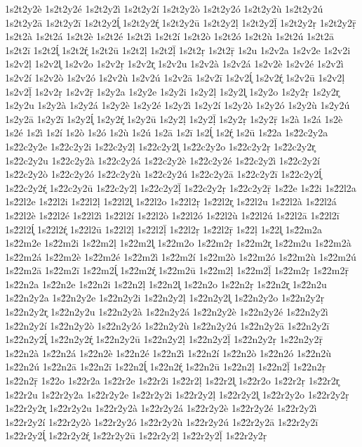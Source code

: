 {1s2t2y2è
1s2t2y2é
1s2t2y2ì
1s2t2y2í
1s2t2y2ò
1s2t2y2ó
1s2t2y2ù
1s2t2y2ú
1s2t2y2ā
1s2t2y2ī
1s2t2y2ĺ̥
1s2t2y2ŕ̥
1s2t2y2ū
1s2t2y2ḷ
1s2t2y2ḹ
1s2t2y2ṛ
1s2t2y2ṝ
1s2t2à
1s2t2á
1s2t2è
1s2t2é
1s2t2ì
1s2t2í
1s2t2ò
1s2t2ó
1s2t2ù
1s2t2ú
1s2t2ā
1s2t2ī
1s2t2ĺ̥
1s2t2ŕ̥
1s2t2ū
1s2t2ḷ
1s2t2ḹ
1s2t2ṛ
1s2t2ṝ
1s2u
1s2v2a
1s2v2e
1s2v2i
1s2v2ḷ
1s2v2l̥
1s2v2o
1s2v2ṛ
1s2v2r̥
1s2v2u
1s2v2à
1s2v2á
1s2v2è
1s2v2é
1s2v2ì
1s2v2í
1s2v2ò
1s2v2ó
1s2v2ù
1s2v2ú
1s2v2ā
1s2v2ī
1s2v2ĺ̥
1s2v2ŕ̥
1s2v2ū
1s2v2ḷ
1s2v2ḹ
1s2v2ṛ
1s2v2ṝ
1s2y2a
1s2y2e
1s2y2i
1s2y2ḷ
1s2y2l̥
1s2y2o
1s2y2ṛ
1s2y2r̥
1s2y2u
1s2y2à
1s2y2á
1s2y2è
1s2y2é
1s2y2ì
1s2y2í
1s2y2ò
1s2y2ó
1s2y2ù
1s2y2ú
1s2y2ā
1s2y2ī
1s2y2ĺ̥
1s2y2ŕ̥
1s2y2ū
1s2y2ḷ
1s2y2ḹ
1s2y2ṛ
1s2y2ṝ
1s2à
1s2á
1s2è
1s2é
1s2ì
1s2í
1s2ò
1s2ó
1s2ù
1s2ú
1s2ā
1s2ī
1s2ĺ̥
1s2ŕ̥
1s2ū
1s2́2a
1s2́2c2y2a
1s2́2c2y2e
1s2́2c2y2i
1s2́2c2y2ḷ
1s2́2c2y2l̥
1s2́2c2y2o
1s2́2c2y2ṛ
1s2́2c2y2r̥
1s2́2c2y2u
1s2́2c2y2à
1s2́2c2y2á
1s2́2c2y2è
1s2́2c2y2é
1s2́2c2y2ì
1s2́2c2y2í
1s2́2c2y2ò
1s2́2c2y2ó
1s2́2c2y2ù
1s2́2c2y2ú
1s2́2c2y2ā
1s2́2c2y2ī
1s2́2c2y2ĺ̥
1s2́2c2y2ŕ̥
1s2́2c2y2ū
1s2́2c2y2ḷ
1s2́2c2y2ḹ
1s2́2c2y2ṛ
1s2́2c2y2ṝ
1s2́2e
1s2́2i
1s2́2l2a
1s2́2l2e
1s2́2l2i
1s2́2l2ḷ
1s2́2l2l̥
1s2́2l2o
1s2́2l2ṛ
1s2́2l2r̥
1s2́2l2u
1s2́2l2à
1s2́2l2á
1s2́2l2è
1s2́2l2é
1s2́2l2ì
1s2́2l2í
1s2́2l2ò
1s2́2l2ó
1s2́2l2ù
1s2́2l2ú
1s2́2l2ā
1s2́2l2ī
1s2́2l2ĺ̥
1s2́2l2ŕ̥
1s2́2l2ū
1s2́2l2ḷ
1s2́2l2ḹ
1s2́2l2ṛ
1s2́2l2ṝ
1s2́2ḷ
1s2́2l̥
1s2́2m2a
1s2́2m2e
1s2́2m2i
1s2́2m2ḷ
1s2́2m2l̥
1s2́2m2o
1s2́2m2ṛ
1s2́2m2r̥
1s2́2m2u
1s2́2m2à
1s2́2m2á
1s2́2m2è
1s2́2m2é
1s2́2m2ì
1s2́2m2í
1s2́2m2ò
1s2́2m2ó
1s2́2m2ù
1s2́2m2ú
1s2́2m2ā
1s2́2m2ī
1s2́2m2ĺ̥
1s2́2m2ŕ̥
1s2́2m2ū
1s2́2m2ḷ
1s2́2m2ḹ
1s2́2m2ṛ
1s2́2m2ṝ
1s2́2n2a
1s2́2n2e
1s2́2n2i
1s2́2n2ḷ
1s2́2n2l̥
1s2́2n2o
1s2́2n2ṛ
1s2́2n2r̥
1s2́2n2u
1s2́2n2y2a
1s2́2n2y2e
1s2́2n2y2i
1s2́2n2y2ḷ
1s2́2n2y2l̥
1s2́2n2y2o
1s2́2n2y2ṛ
1s2́2n2y2r̥
1s2́2n2y2u
1s2́2n2y2à
1s2́2n2y2á
1s2́2n2y2è
1s2́2n2y2é
1s2́2n2y2ì
1s2́2n2y2í
1s2́2n2y2ò
1s2́2n2y2ó
1s2́2n2y2ù
1s2́2n2y2ú
1s2́2n2y2ā
1s2́2n2y2ī
1s2́2n2y2ĺ̥
1s2́2n2y2ŕ̥
1s2́2n2y2ū
1s2́2n2y2ḷ
1s2́2n2y2ḹ
1s2́2n2y2ṛ
1s2́2n2y2ṝ
1s2́2n2à
1s2́2n2á
1s2́2n2è
1s2́2n2é
1s2́2n2ì
1s2́2n2í
1s2́2n2ò
1s2́2n2ó
1s2́2n2ù
1s2́2n2ú
1s2́2n2ā
1s2́2n2ī
1s2́2n2ĺ̥
1s2́2n2ŕ̥
1s2́2n2ū
1s2́2n2ḷ
1s2́2n2ḹ
1s2́2n2ṛ
1s2́2n2ṝ
1s2́2o
1s2́2r2a
1s2́2r2e
1s2́2r2i
1s2́2r2ḷ
1s2́2r2l̥
1s2́2r2o
1s2́2r2ṛ
1s2́2r2r̥
1s2́2r2u
1s2́2r2y2a
1s2́2r2y2e
1s2́2r2y2i
1s2́2r2y2ḷ
1s2́2r2y2l̥
1s2́2r2y2o
1s2́2r2y2ṛ
1s2́2r2y2r̥
1s2́2r2y2u
1s2́2r2y2à
1s2́2r2y2á
1s2́2r2y2è
1s2́2r2y2é
1s2́2r2y2ì
1s2́2r2y2í
1s2́2r2y2ò
1s2́2r2y2ó
1s2́2r2y2ù
1s2́2r2y2ú
1s2́2r2y2ā
1s2́2r2y2ī
1s2́2r2y2ĺ̥
1s2́2r2y2ŕ̥
1s2́2r2y2ū
1s2́2r2y2ḷ
1s2́2r2y2ḹ
1s2́2r2y2ṛ
}
